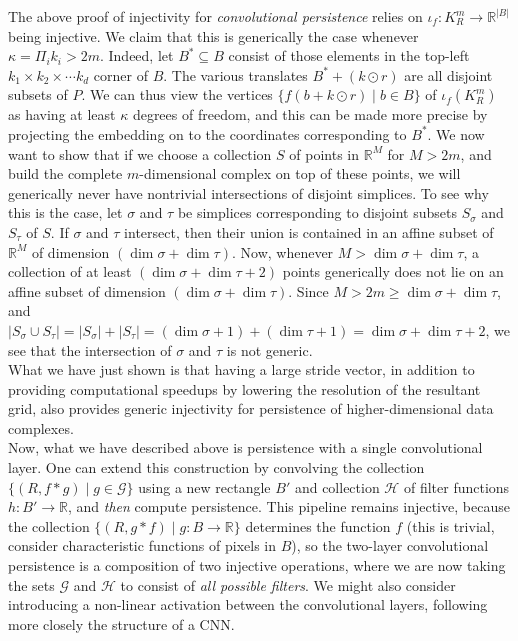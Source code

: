 \documentclass[conference]{IEEEtran}
\theoremstyle{definition}
\numberwithin{figure}{section}
\begin{document}
The above proof of injectivity for \emph{convolutional persistence} relies on $\iota_{f}:K_{R}^{m} \to \mathbb{R}^{|B|}$ being injective. We claim that this is generically the case whenever $\kappa = \Pi_{i}k_i > 2m$. Indeed, let $B^{*} \subseteq B$ consist of those elements in the top-left $k_1 \times k_2 \times \cdots k_d$ corner of $B$. The various translates $B^{*} + (k \odot r)$ are all disjoint subsets of $P$. We can thus view the vertices $\{f(b + k \odot r) \mid b \in B\}$ of $\iota_{f}(K_{R}^m)$ as having at least $\kappa$ degrees of freedom, and this can be made more precise by projecting the embedding on to the coordinates corresponding to $B^*$. We now want to show that if we choose a collection $S$ of points in $\mathbb{R}^{M}$ for $M > 2m$, and build the complete $m$-dimensional complex on top of these points, we will generically never have nontrivial intersections of disjoint simplices. To see why this is the case, let $\sigma$ and $\tau$ be simplices corresponding to disjoint subsets $S_{\sigma}$ and $S_{\tau}$ of $S$. If $\sigma$ and $\tau$ intersect, then their union is contained in an affine subset of $\mathbb{R}^M$ of dimension $(\dim \sigma + \dim \tau)$. Now, whenever $M > \dim \sigma + \dim \tau$, a collection of at least $(\dim \sigma + \dim \tau + 2)$ points generically does not lie on an affine subset of dimension $(\dim \sigma + \dim \tau)$. Since $M > 2m \geq \dim \sigma + \dim \tau$, and $|S_{\sigma} \cup S_{\tau}| = |S_{\sigma}| + |S_{\tau}| = (\dim \sigma + 1) + (\dim \tau + 1) = \dim \sigma + \dim \tau + 2$, we see that the intersection of $\sigma$ and $\tau$ is not generic.\\

What we have just shown is that having a large stride vector, in addition to providing computational speedups by lowering the resolution of the resultant grid, also provides generic injectivity for persistence of higher-dimensional data complexes.\\ 

Now, what we have described above is persistence with a single convolutional layer. One can extend this construction by convolving the collection $\{(R, f \ast g) \mid g \in \mathcal{G}\}$ using a new rectangle $B'$ and collection $\mathcal{H}$ of filter functions $h: B' \to \mathbb{R}$, and \emph{then} compute persistence. This pipeline remains injective, because the collection $\{(R, g \ast f) \mid g: B \to \mathbb{R}\}$ determines the function $f$ (this is trivial, consider characteristic functions of pixels in $B$), so the two-layer convolutional persistence is a composition of two injective operations, where we are now taking the sets $\mathcal{G}$ and $\mathcal{H}$ to consist of \emph{all possible filters}. We might also consider introducing a non-linear activation between the convolutional layers, following more closely the structure of a CNN.\\
\end{document}
